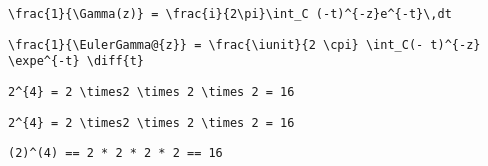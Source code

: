 \newsavebox\AET
\begin{lrbox}{\AET}
 \begin{minipage}[t]{0.82\textwidth}
  \lstinline[language={[latex]TeX},mathescape,breaklines=true]"\frac{1}{\Gamma(z)} = \frac{i}{2\pi}\int_C (-t)^{-z}e^{-t}\,dt"
 \end{minipage}
\end{lrbox}
\newsavebox\AEST
\begin{lrbox}{\AEST}
 \begin{minipage}[t]{0.82\textwidth}
  \lstinline[language={[latex]TeX},mathescape,breaklines=true]"\frac{1}{\EulerGamma@{z}} = \frac{\iunit}{2 \cpi} \int_C(- t)^{-z} \expe^{-t} \diff{t}"
 \end{minipage}
\end{lrbox}
\newsavebox\AEMM
\begin{lrbox}{\AEMM}
 \begin{minipage}[t]{0.82\textwidth}
  \lstinline[language={[latex]TeX},mathescape,breaklines=true]""
 \end{minipage}
\end{lrbox}
\newsavebox\AEMA
\begin{lrbox}{\AEMA}
 \begin{minipage}[t]{0.82\textwidth}
  \lstinline[language={[latex]TeX},mathescape,breaklines=true]""
 \end{minipage}
\end{lrbox}
\newsavebox\AFT
\begin{lrbox}{\AFT}
 \begin{minipage}[t]{0.82\textwidth}
  \lstinline[language={[latex]TeX},mathescape,breaklines=true]"2^{4} = 2 \times2 \times 2 \times 2 = 16"
 \end{minipage}
\end{lrbox}
\newsavebox\AFST
\begin{lrbox}{\AFST}
 \begin{minipage}[t]{0.82\textwidth}
  \lstinline[language={[latex]TeX},mathescape,breaklines=true]"2^{4} = 2 \times2 \times 2 \times 2 = 16"
 \end{minipage}
\end{lrbox}
\newsavebox\AFMM
\begin{lrbox}{\AFMM}
 \begin{minipage}[t]{0.82\textwidth}
  \lstinline[language={[latex]TeX},mathescape,breaklines=true]"(2)^(4) == 2 * 2 * 2 * 2 == 16"
 \end{minipage}
\end{lrbox}
